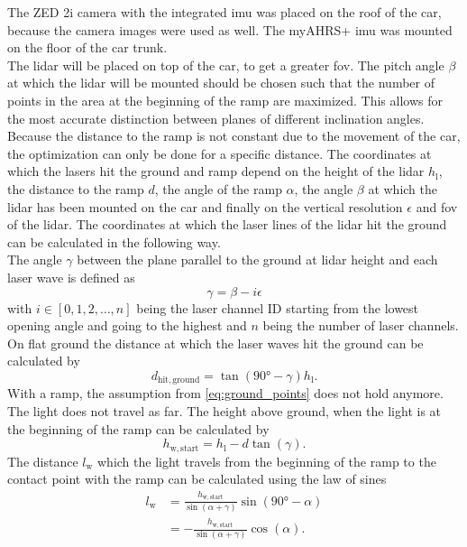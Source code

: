 The ZED 2i camera with the integrated \gls{imu} was placed on the roof of the car, because the camera images were used as well.
The myAHRS+ \gls{imu} was mounted on the floor of the car trunk.\\
The \gls{lidar} will be placed on top of the car, to get a greater \gls{fov}.
The pitch angle $\beta$ at which the \gls{lidar} will be mounted should be chosen such that the number of points in the area at the beginning of the ramp are maximized.
This allows for the most accurate distinction between planes of different inclination angles.
Because the distance to the ramp is not constant due to the movement of the car, the optimization can only be done for a specific distance.
The coordinates at which the lasers hit the ground and ramp depend on the height of the \gls{lidar} $h_\mathrm{l}$, the distance to the ramp $d$, the angle of the ramp $\alpha$, the angle $\beta$ at which the \gls{lidar} has been mounted on the car and finally on the vertical resolution $\epsilon$ and \gls{fov} of the \gls{lidar}.
The coordinates at which the laser lines of the \gls{lidar} hit the ground can be calculated in the following way.\\
The angle $\gamma$ between the plane parallel to the ground at \gls{lidar} height and each laser wave is defined as
\begin{equation}
	\gamma = \beta - i\epsilon
\end{equation}
with $i \in [0,1,2,\dots,n]$ being the laser channel ID starting from the lowest opening angle and going to the highest and $n$ being the number of laser channels.
On flat ground the distance at which the laser waves hit the ground can be calculated by
\begin{equation}
	d_\mathrm{hit,ground}  = \tan(\ang{90} - \gamma) h_\mathrm{l}.
	\label{eq:ground_points}
\end{equation}
With a ramp, the assumption from \cref{eq:ground_points} does not hold anymore.
The light does not travel as far.
The height above ground, when the light is at the beginning of the ramp can be calculated by
\begin{equation}
	h_\mathrm{w,start} = h_\mathrm{l} - d\tan(\gamma).
\end{equation}
The distance $l_\mathrm{w}$ which the light travels from the beginning of the ramp to the contact point with the ramp can be calculated using the law of sines
\begin{align}
	l_\mathrm{w} & = \frac{h_\mathrm{w,start} }{\sin(\alpha + \gamma)} \sin(\ang{90} - \alpha) \nonumber \\
	             & = -\frac{h_\mathrm{w,start} }{\sin(\alpha + \gamma)} \cos(\alpha).
\end{align}
